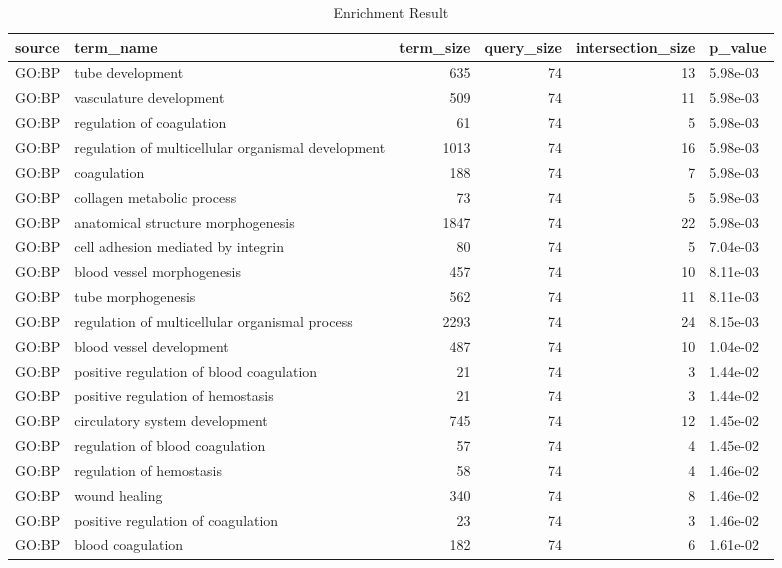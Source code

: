 \documentclass[
]{book}
\begin{document}
\begin{table}
\centering
\caption{\label{tab:unnamed-chunk-16}Enrichment Result}
\centering
\fontsize{10}{12}\selectfont
\begin{tabular}[t]{l|l|r|r|r|l}
\hline
source & term\_name & term\_size & query\_size & intersection\_size & p\_value\\
\hline
GO:BP & tube development & 635 & 74 & 13 & 5.98e-03\\
\hline
GO:BP & vasculature development & 509 & 74 & 11 & 5.98e-03\\
\hline
GO:BP & regulation of coagulation & 61 & 74 & 5 & 5.98e-03\\
\hline
GO:BP & regulation of multicellular organismal development & 1013 & 74 & 16 & 5.98e-03\\
\hline
GO:BP & coagulation & 188 & 74 & 7 & 5.98e-03\\
\hline
GO:BP & collagen metabolic process & 73 & 74 & 5 & 5.98e-03\\
\hline
GO:BP & anatomical structure morphogenesis & 1847 & 74 & 22 & 5.98e-03\\
\hline
GO:BP & cell adhesion mediated by integrin & 80 & 74 & 5 & 7.04e-03\\
\hline
GO:BP & blood vessel morphogenesis & 457 & 74 & 10 & 8.11e-03\\
\hline
GO:BP & tube morphogenesis & 562 & 74 & 11 & 8.11e-03\\
\hline
GO:BP & regulation of multicellular organismal process & 2293 & 74 & 24 & 8.15e-03\\
\hline
GO:BP & blood vessel development & 487 & 74 & 10 & 1.04e-02\\
\hline
GO:BP & positive regulation of blood coagulation & 21 & 74 & 3 & 1.44e-02\\
\hline
GO:BP & positive regulation of hemostasis & 21 & 74 & 3 & 1.44e-02\\
\hline
GO:BP & circulatory system development & 745 & 74 & 12 & 1.45e-02\\
\hline
GO:BP & regulation of blood coagulation & 57 & 74 & 4 & 1.45e-02\\
\hline
GO:BP & regulation of hemostasis & 58 & 74 & 4 & 1.46e-02\\
\hline
GO:BP & wound healing & 340 & 74 & 8 & 1.46e-02\\
\hline
GO:BP & positive regulation of coagulation & 23 & 74 & 3 & 1.46e-02\\
\hline
GO:BP & blood coagulation & 182 & 74 & 6 & 1.61e-02\\
\hline
\end{tabular}
\end{table}
\end{document}
